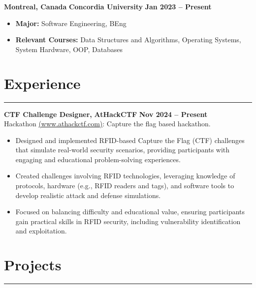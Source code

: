 \documentclass[10pt]{article}
\begin{document}
\textbf{Montreal, Canada} \hfill \textbf{Concordia University} \hfill \textbf{Jan 2023 -- Present} 
\vspace{-4mm}
\begin{itemize}[left=0.15in, itemsep=0pt]
    \item \textbf{Major:} Software Engineering, BEng
    \item \textbf{Relevant Courses:} Data Structures and Algorithms, Operating Systems, System Hardware, OOP, Databases
\end{itemize}

\section*{Experience}
\vspace{-2mm}
\hrule
\vspace{0mm}

\textbf{CTF Challenge Designer, } \hfill \textbf{AtHackCTF} \hfill \textbf{Nov 2024 -- Present} \\
{Hackathon {\href{https://www.athackctf.com}{(www.athackctf.com)}: Capture the flag based hackathon.}}
\vspace{-4mm}
\begin{itemize}[left=0.15in, itemsep=0pt]
    \item Designed and implemented RFID-based Capture the Flag (CTF) challenges that simulate real-world security scenarios, providing participants with engaging and educational problem-solving experiences.
    \item Created challenges involving RFID technologies, leveraging knowledge of protocols, hardware (e.g., RFID readers and tags), and software tools to develop realistic attack and defense simulations.
    \item Focused on balancing difficulty and educational value, ensuring participants gain practical skills in RFID security, including vulnerability identification and exploitation.
\end{itemize}

\section*{Projects}
\vspace{-2mm}
\hrule
\vspace{0mm}
\end{document}
